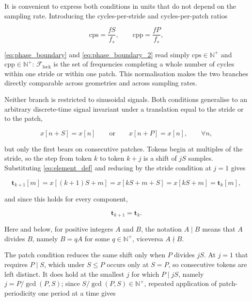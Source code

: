 It is convenient to express both conditions in units that do not depend on the sampling rate. Introducing the cycles-per-stride and cycles-per-patch ratios

\begin{equation*}
\mathrm{cps}
=
\frac{f S}{f_s},
\qquad
\mathrm{cpp}
=
\frac{f P}{f_s},
\end{equation*}

\autoref{eq:phase_boundary} and \autoref{eq:phase_boundary_2} read simply $\mathrm{cps}\in\mathbb{N}^{+}$ and $\mathrm{cpp}\in\mathbb{N}^{+}$: $\mathcal{F}_{\mathrm{lock}}$ is the set of frequencies completing a whole number of cycles within one stride or within one patch. This normalisation makes the two branches directly comparable across geometries and across sampling rates.

Neither branch is restricted to sinusoidal signals. Both conditions generalise to an arbitrary discrete-time signal invariant under a translation equal to the stride or to the patch,

\begin{equation*}
x[n+S]
=
x[n]
\qquad\text{or}\qquad
x[n+P]
=
x[n],
\qquad
\forall n,
\end{equation*}

but only the first bears on consecutive patches. Tokens begin at multiples of the stride, so the step from token $k$ to token $k+j$ is a shift of $jS$ samples. Substituting \autoref{eq:element_def} and reducing by the stride condition at $j=1$ gives

\begin{equation}
\label{eq:collapse_S}
\mathbf{t}_{k+1}[m]
=
x[(k+1)S+m]
=
x[kS+m+S]
=
x[kS+m]
=
\mathbf{t}_k[m],
\end{equation}

and since this holds for every component,

\begin{equation}
\label{eq:token_collapse}
\mathbf{t}_{k+1}
=
\mathbf{t}_k.
\end{equation}

Here and below, for positive integers $A$ and $B$, the notation $A\mid B$ means that $A$ divides $B$, namely $B=qA$ for some $q\in\mathbb{N}^{+}$, viceversa $A\nmid B$.

The patch condition reduces the same shift only when $P$ divides $jS$. At $j=1$ that requires $P \mid S$, which under $S\le P$ occurs only at $S=P$, so consecutive tokens are left distinct. It does hold at the smallest $j$ for which $P \mid jS$, namely $j = P/\gcd(P,S)$; since $S/\gcd(P,S)\in\mathbb{N}^{+}$, repeated application of patch-periodicity one period at a time gives

